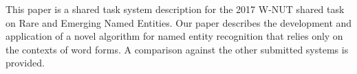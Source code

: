 This paper is a shared task system description for the 2017 W-NUT shared task on Rare and Emerging Named Entities. Our paper describes the development and application of a novel algorithm for named entity recognition that relies only on the contexts of word forms. A comparison against the other submitted systems is provided.
